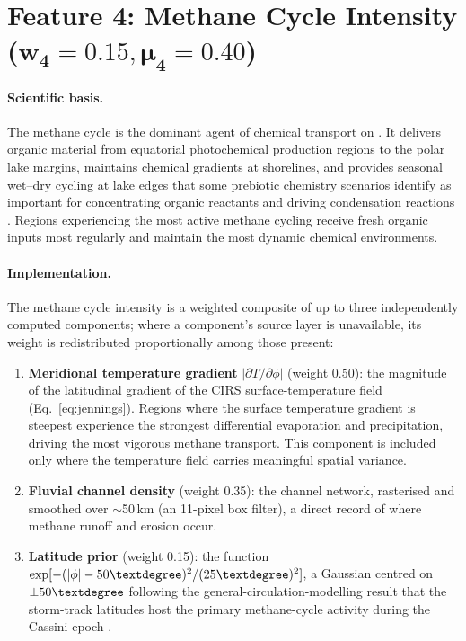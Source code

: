 \section[Feature 4: Methane Cycle Intensity
  ($w_4 = 0.15$, $\mu_4 = 0.40$)]{Feature 4: Methane Cycle Intensity \\
  ($\boldsymbol{w_4 = 0.15, \mu_4 = 0.40}$)}
\label{sec:feat_methane}

\paragraph{Scientific basis.}
The methane cycle is the dominant agent of chemical transport on \titan{}.
It delivers organic material from equatorial photochemical production regions
to the polar lake margins, maintains chemical gradients at shorelines, and
provides seasonal wet--dry cycling at lake edges that some prebiotic chemistry
scenarios identify as important for concentrating organic reactants and driving
condensation reactions \citep{Benner2004, MitchellLora2016}.  Regions
experiencing the most active methane cycling receive fresh organic inputs
most regularly and maintain the most dynamic chemical environments.

\paragraph{Implementation.}
The methane cycle intensity is a weighted composite of up to three
independently computed components; where a component's source layer is
unavailable, its weight is redistributed proportionally among those present:
\begin{enumerate}
  \item \textbf{Meridional temperature gradient} $|\partial T/\partial\phi|$
    (weight 0.50): the magnitude of the latitudinal gradient of the CIRS
    surface-temperature field (Eq.~\ref{eq:jennings}).  Regions where the
    surface temperature gradient is steepest experience the strongest
    differential evaporation and precipitation, driving the most vigorous
    methane transport.  This component is included only where the temperature
    field carries meaningful spatial variance.
  \item \textbf{Fluvial channel density} (weight 0.35): the
    \citet{Miller2021channels} channel network, rasterised and smoothed over
    $\sim$50\,km (an 11-pixel box filter), a direct record of where methane
    runoff and erosion occur.
  \item \textbf{Latitude prior} (weight 0.15): the function
    $\exp[-(|\phi| - 50\textdegree)^2/(25\textdegree)^2]$, a Gaussian centred
    on $\pm 50\textdegree$ following the general-circulation-modelling result
    that the storm-track latitudes host the primary methane-cycle activity
    during the Cassini epoch \citep{MitchellLora2016}.
\end{enumerate}


